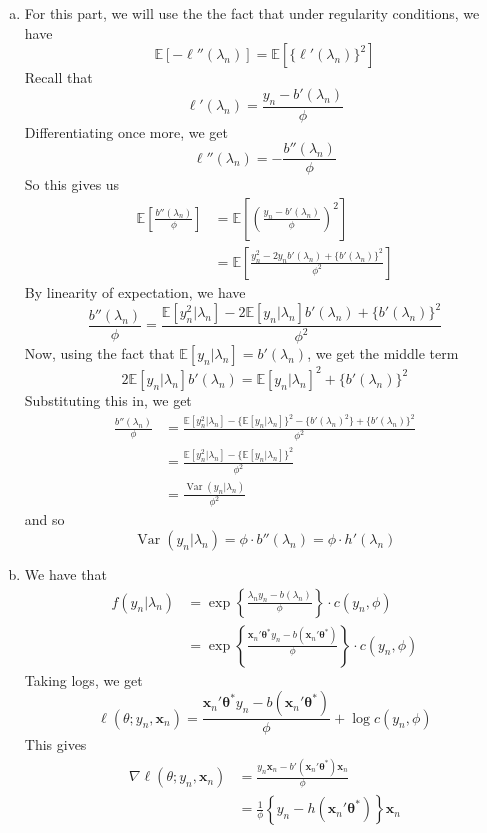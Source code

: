 \documentclass[letterpaper,10pt]{amsart}
\newcommand{\E}[1]{\mathbb{E}\!\left[#1\right]}
\newcommand{\Var}{\operatorname{Var}}
\begin{document}
\begin{enumerate}[1.]
\begin{enumerate}[(a)]
\item For this part, we will use the the fact that under regularity conditions, we have
\[\E{-\ell''(\lambda_n)} = \E{\{\ell'(\lambda_n)\}^2}\]
Recall that
\[\ell'(\lambda_n) = \frac{y_n - b'(\lambda_n)}{\phi}\]
Differentiating once more, we get
\[\ell''(\lambda_n) = -\frac{b''(\lambda_n)}{\phi}\]
So this gives us
\begin{align*}
\E{\frac{b''(\lambda_n)}{\phi}} &= \E{\left(\frac{y_n - b'(\lambda_n)}{\phi}\right)^2}\\
&= \E{\frac{y_n^2 - 2 y_n b'(\lambda_n) + \{b'(\lambda_n)\}^2}{\phi^2}}
\end{align*}
By linearity of expectation, we have
\[\frac{b''(\lambda_n)}{\phi} = \frac{\E{y_n^2 | \lambda_n} - 2\E{y_n | \lambda_n} b'(\lambda_n) + \{b'(\lambda_n)\}^2}{\phi^2}\]
Now, using the fact that $\E{y_n | \lambda_n} = b'(\lambda_n)$, we get the middle term
\[2\E{y_n | \lambda_n}b'(\lambda_n) = \E{y_n | \lambda_n}^2 + \{b'(\lambda_n)\}^2\]
Substituting this in, we get
\begin{align*}
\frac{b''(\lambda_n)}{\phi} &= \frac{\E{y_n^2 | \lambda_n} - \{\E{y_n | \lambda_n}\}^2 - \{b'(\lambda_n)^2\} + \{b'(\lambda_n)\}^2}{\phi^2}\\
&= \frac{\E{y_n^2 | \lambda_n} - \{\E{y_n | \lambda_n}\}^2}{\phi^2}\\
&= \frac{\Var(y_n | \lambda_n)}{\phi^2}
\end{align*}
and so
\[\Var(y_n | \lambda_n) = \phi \cdot b''(\lambda_n) = \phi \cdot h'(\lambda_n)\]

\item
We have that 
\begin{align*}
f(y_n | \lambda_n) &= \exp\left\{\frac{\lambda_n y_n - b(\lambda_n)}{\phi}\right\} \cdot c(y_n, \phi)\\
&= \exp\left\{\frac{\boldsymbol x_n' \boldsymbol \theta^* y_n - b(\boldsymbol x_n' \boldsymbol \theta^*)}{\phi}\right\} \cdot c(y_n, \phi)
\end{align*}
Taking logs, we get
\[\ell(\theta; y_n, \boldsymbol x_n) = \frac{\boldsymbol x_n' \boldsymbol \theta^* y_n - b(\boldsymbol x_n' \boldsymbol \theta^*)}{\phi}  + \log c(y_n, \phi)\]
This gives
\begin{align*}
\nabla \ell(\theta; y_n, \boldsymbol x_n) &= \frac{y_n \boldsymbol x_n - b'(\boldsymbol x_n' \boldsymbol \theta^*) \boldsymbol x_n}{\phi}\\
&= \frac{1}{\phi}\left\{y_n - h(\boldsymbol x_n' \boldsymbol \theta^*)\right\} \boldsymbol x_n
\end{align*}


\end{enumerate}
\end{enumerate}
\end{document}
